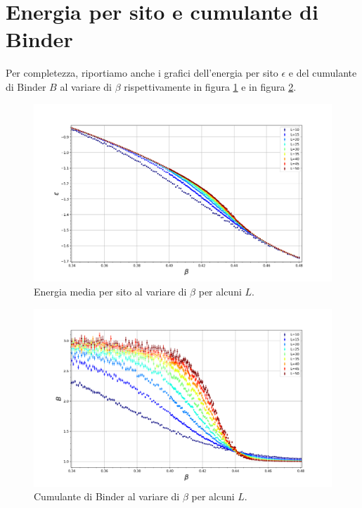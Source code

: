 \documentclass[10pt,a4paper]{article}
\begin{document}
\section{Energia per sito e cumulante di Binder}
Per completezza, riportiamo anche i grafici dell'energia per sito $\epsilon$ e del cumulante di Binder $B$ al variare di $\beta$ rispettivamente in figura \ref{ene} e in figura \ref{binder}.
\begin{figure}[h!]
	\centering
	\includegraphics[width=1\linewidth]{ene}
	\caption{Energia media per sito al variare di $\beta$ per alcuni $L$.}
	\label{ene}
\end{figure}
\begin{figure}[h!]
	\centering
	\includegraphics[width=1\linewidth]{binder}
	\caption{Cumulante di Binder al variare di $\beta$ per alcuni $L$.}
	\label{binder}
\end{figure}


\newpage
\end{document}
